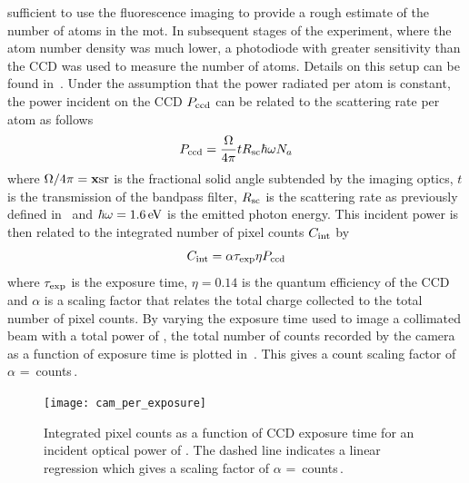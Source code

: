 sufficient to use the fluorescence imaging to provide a rough estimate of the
number of atoms in the \ac{mot}. In subsequent stages of the experiment, where
the atom number density was much lower, a photodiode with greater sensitivity
than the CCD was used to measure the number of atoms. Details on this setup can
be found in~. Under the assumption that the
power radiated per atom is constant, the power incident on the CCD
\(P_\textnormal{ccd}\) can be related to the scattering rate per atom as follows
\begin{equation}
	P_\textnormal{ccd} = \frac{\Omega}{4\pi} t R_\textnormal{sc}  \hbar \omega N_a
\end{equation}
where $\Omega/4\pi = \textbf{x}\sivalue{}{\steradian}$ is the fractional solid
angle subtended by the imaging optics, \(t\) is the transmission of the bandpass
filter, \(R_\textnormal{sc}\) is the scattering rate as previously defined
in~ and \(\hbar \omega =
\sivalue{1.6}{\electronvolt}\) is the emitted photon energy. This incident power
is then related to the integrated number of pixel counts \(C_\textnormal{int}\)
by
\begin{equation}
	C_\textnormal{int} = \alpha \tau_\textnormal{exp} \eta P_\textnormal{ccd}
\end{equation}
where \(\tau_\textnormal{exp}\) is the exposure time, \(\eta = 0.14\) is the
quantum efficiency of the CCD and \(\alpha\) is a scaling factor that relates
the total charge collected to the total number of pixel counts. By varying the
exposure time used to image a collimated beam with a total power of
, the total number of counts recorded by the camera
as a function of exposure time is plotted in~. This
gives a count scaling factor of \(\alpha\) =
\,counts\,\sivalue{}{\per\micro\second\per\micro\watt}.
\begin{figure}
	\centering
	\texttt{[image: cam\_per\_exposure]}
	\caption[Integrated pixel counts as a function of CCD exposure
		time.]{Integrated pixel counts as a function of CCD exposure time for an
		incident optical power of . The dashed line
		indicates a linear regression which gives a scaling factor of \(\alpha\)
		=
		\,counts\,\sivalue{}{\per\micro\second\per\micro\watt}.}
	\label{fig:camera_counts}
\end{figure}

